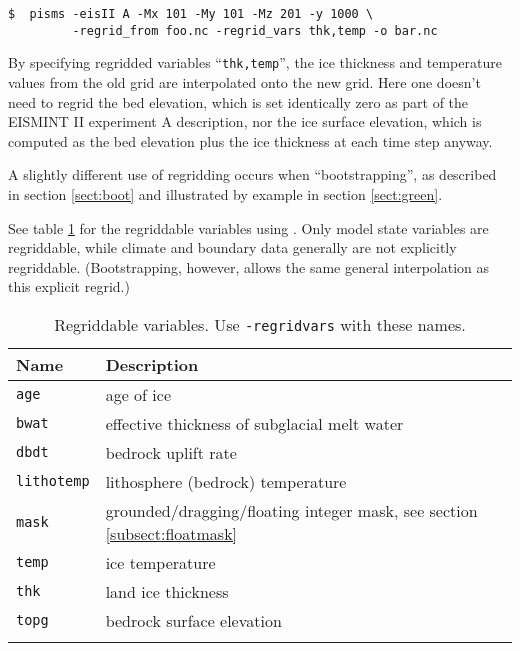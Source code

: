 \begin{verbatim}
$  pisms -eisII A -Mx 101 -My 101 -Mz 201 -y 1000 \
         -regrid_from foo.nc -regrid_vars thk,temp -o bar.nc
\end{verbatim}
\noindent By specifying regridded variables ``\verb|thk,temp|'', the ice thickness and temperature values from the old grid are interpolated onto the new grid.  Here one doesn't need to regrid the bed elevation, which is set identically zero as part of the EISMINT II experiment A description, nor the ice surface elevation, which is computed as the bed elevation plus the ice thickness at each time step anyway.

A slightly different use of regridding occurs when ``bootstrapping'', as described in section \ref{sect:boot} and illustrated by example in section \ref{sect:green}.

See table \ref{tab:regridvar} for the regriddable variables using .  Only model state variables are regriddable, while climate and boundary data generally are not explicitly regriddable.  (Bootstrapping, however, allows the same general interpolation as this explicit regrid.)

\begin{table}[ht]
\centering
\caption{Regriddable variables.  Use \texttt{-regrid\und vars} with these names.}\label{tab:regridvar}
\begin{tabular}{ll}\hline
\textbf{Name} & \textbf{Description}\\ \hline
\texttt{age} & age of ice\\
\texttt{bwat} & effective thickness of subglacial melt water \\
\texttt{dbdt} & bedrock uplift rate \\
\texttt{litho\und temp} & lithosphere (bedrock) temperature \\
\texttt{mask} & grounded/dragging/floating integer mask, see section \ref{subsect:floatmask} \\
\texttt{temp} & ice temperature \\
\texttt{thk} & land ice thickness \\
\texttt{topg} & bedrock surface elevation \\
\hline
\normalsize
\end{tabular}
\end{table}

